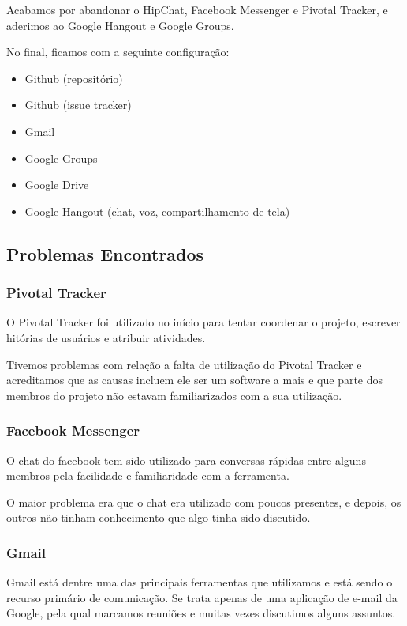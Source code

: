\documentclass{acm_proc_article-sp}
\begin{document}
Acabamos por abandonar o HipChat, Facebook Messenger e Pivotal Tracker, e aderimos ao Google Hangout e Google Groups.

No final, ficamos com a seguinte configuração:

\begin{itemize}
  \item Github (repositório)
  \item Github (issue tracker)
  \item Gmail
  \item Google Groups
  \item Google Drive
  \item Google Hangout (chat, voz, compartilhamento de tela)
\end{itemize}

\subsection{Problemas Encontrados}
\subsubsection{Pivotal Tracker}
O Pivotal Tracker foi utilizado no início para tentar coordenar o projeto, escrever hitórias de usuários e atribuir atividades.

Tivemos problemas com relação a falta de utilização do Pivotal Tracker e acreditamos que
as causas incluem ele ser um software a mais e que parte dos membros do projeto não estavam familiarizados
com a sua utilização.

\subsubsection{Facebook Messenger}
O chat do facebook tem sido utilizado para conversas rápidas entre alguns membros pela facilidade e familiaridade com a ferramenta.

O maior problema era que o chat era utilizado com poucos presentes, e depois, os outros não tinham conhecimento
que algo tinha sido discutido.

\subsubsection{Gmail}
Gmail está dentre uma das principais ferramentas que utilizamos e está sendo o recurso primário de comunicação.
Se trata apenas de uma aplicação de e-mail da Google, pela qual marcamos reuniões e muitas vezes discutimos alguns assuntos.
\end{document}
